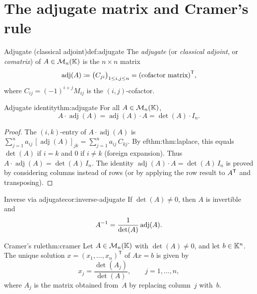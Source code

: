\section{The adjugate matrix and Cramer's rule}\label{sec:adjugate}

\begin{definition}{Adjugate (classical adjoint)}{def:adjugate}
The \emph{adjugate} (or \emph{classical adjoint}, or
\emph{comatrix}) of
$A\in\mathcal{M}_n({\mathbb{K}})$ is the $n\times n$ matrix
\[
  \operatorname{adj}(A) \coloneqq \bigl(C_{ji}\bigr)_{1\leq i,j\leq n}
  = {(\text{cofactor matrix})}^{\mathsf{T}},
\]
where $C_{ij}=(-1)^{i+j}M_{ij}$ is the $(i,j)$-cofactor.
\end{definition}

\begin{theorem}{Adjugate identity}{thm:adjugate}
For all $A\in\mathcal{M}_n({\mathbb{K}})$,
\[
  A\cdot\operatorname{adj}(A) = \operatorname{adj}(A)\cdot A
  = \det(A)\cdot I_n.
\]
\end{theorem}

\begin{proof}
The $(i,k)$-entry of $A\cdot\operatorname{adj}(A)$ is
$\sum_{j=1}^n a_{ij}\,[\operatorname{adj}(A)]_{jk}
= \sum_{j=1}^n a_{ij}\,C_{kj}$.
By 
ef{thm:thm:laplace}, this equals $\det(A)$ if $i=k$ and $0$ if
$i\neq k$ (foreign expansion). Thus
$A\cdot\operatorname{adj}(A)=\det(A)\,I_n$. The identity
$\operatorname{adj}(A)\cdot A = \det(A)\,I_n$ is proved by
considering columns instead of rows (or by applying the row result
to ${A}^{\mathsf{T}}$ and transposing).
\end{proof}

\begin{corollary}{Inverse via adjugate}{cor:inverse-adjugate}
If $\det(A)\neq 0$, then $A$ is invertible and
\[
  {A}^{-1} = \frac{1}{\det(A)}\operatorname{adj}(A).
\]
\end{corollary}

\begin{theorem}{Cramer's rule}{thm:cramer}
Let $A\in\mathcal{M}_n({\mathbb{K}})$ with $\det(A)\neq 0$, and let $b\in{\mathbb{K}}^n$.
The unique solution $x=(x_1,\ldots,x_n)^{\mathsf{T}}$ of $Ax=b$ is
given by
\[
  x_j = \frac{\det(A_j)}{\det(A)},\qquad j=1,\ldots,n,
\]
where $A_j$ is the matrix obtained from~$A$ by replacing column~$j$
with~$b$.
\end{theorem}

